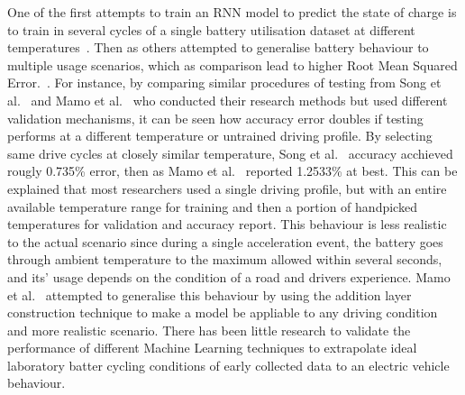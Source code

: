 %
%
One of the first attempts to train an RNN model to predict the state of charge is to train in several cycles of a single battery utilisation dataset at different temperatures~\cite{song_lithium-ion_2018, xiao_accurate_2019,javid_adaptive_2020, jiao_gru-rnn_2020}.
Then as others attempted to generalise battery behaviour to multiple usage scenarios, which as comparison lead to higher Root Mean Squared Error.~\cite{mamo_long_2020}.
For instance, by comparing similar procedures of testing from Song et al.~\cite{song_lithium-ion_2018} and Mamo et al.~\cite{mamo_long_2020} who conducted their research methods but used different validation mechanisms, it can be seen how accuracy error doubles if testing performs at a different temperature or untrained driving profile.
By selecting same drive cycles at closely similar temperature, Song et al.~\cite{song_lithium-ion_2018} accuracy acchieved rougly 0.735\% error, then as Mamo et al.~\cite{mamo_long_2020} reported 1.2533\% at best.
This can be explained that most researchers used a single driving profile, but with an entire available temperature range for training and then a portion of handpicked temperatures for validation and accuracy report.
This behaviour is less realistic to the actual scenario since during a single acceleration event, the battery goes through ambient temperature to the maximum allowed within several seconds, and its' usage depends on the condition of a road and drivers experience.
Mamo et al.~\cite{mamo_long_2020} attempted to generalise this behaviour by using the addition layer construction technique to make a model be appliable to any driving condition and more realistic scenario.
There has been little research to validate the performance of different Machine Learning techniques to extrapolate ideal laboratory batter cycling conditions of early collected data to an electric vehicle behaviour.
